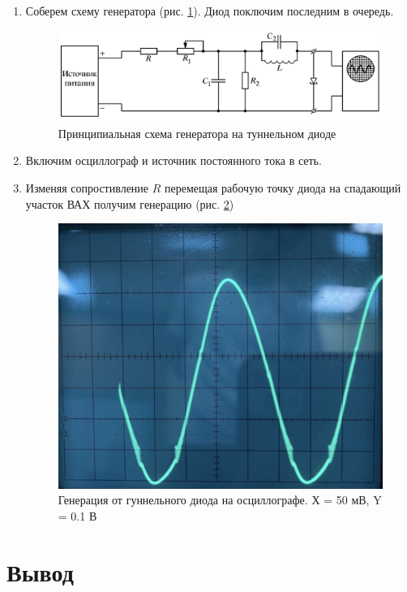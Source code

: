 \documentclass[a4paper]{article}
\begin{document}
\begin{enumerate}
    \item Соберем схему генератора (рис. \ref{gen}). Диод поключим последним в очередь.

        \begin{figure}[h]
            \begin{center}
                \includegraphics[scale = 0.8]{gen.png}
                \caption{Принципиальная схема генератора на туннельном диоде}
                \label{gen}
            \end{center}
        \end{figure}

    \item Включим осциллограф и источник постоянного тока в сеть.
    \item Изменяя сопростивление $R$ перемещая рабочую точку диода на спадающий участок ВАХ получим генерацию (рис. \ref{gen1})

    \begin{figure}[H]
        \begin{center}
            \includegraphics[scale = 0.2]{gen1.jpg}
            \caption{Генерация от гуннельного диода на осциллографе. Х = 50 мВ, Y = 0.1 В}
            \label{gen1}
        \end{center}
    \end{figure}

\end{enumerate}


\section{Вывод}
\end{document}
